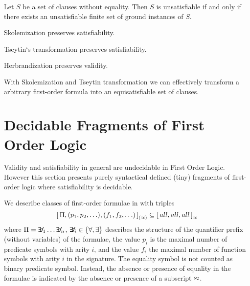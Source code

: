 \begin{corollary}
	Let \( S \) be a set of clauses without equality.
	Then \( S \) is unsatisfiable if and only if there exists
	an unsatisfiable finite set of ground instances of \( S \).
\end{corollary}

\begin{lemma}
	Skolemization preserves satisfiability.

	Tseytin`s transformation preserves satisfiability.
\end{lemma}

\begin{lemma}
	Herbrandization preserves validity.
\end{lemma}

\begin{lemma}
With Skolemization and Tseytin transformation we can effectively transform a arbitrary first-order formula into an equisatisfiable set of clauses.
\end{lemma}


\section{Decidable Fragments of First Order Logic}\label{sec:decidable:fol:fragments}

Validity and satisfiability in general are undecidable in First Order Logic.
However this section presents purely syntactical defined (tiny) fragments
of first-order logic where satisfiability is decidable.%





\begin{definition}[\cite{MR1482227}]\label{def:prefix:class}
	We describe classes of first-order formulae in \PNF{} with triples
	\[
	{[ \, \Pi, (p_1,p_2,\ldots), (f_1,f_2,\ldots) \, ]}_{(\approx)}
	\subseteq {[\, all, all, all\,]}_{\approx}
	\]
	where \( \Pi = \quantify_1 \ldots \quantify_n \),
	\( \quantify_i\in \{ \forall, \exists \} \)
	describes the structure of the quantifier prefix (without variables) of the formulae,
	the value \( p_i \) is the maximal number of predicate symbols with arity \( i \),
	and the value \( f_i \) the maximal number of function symbols with arity \( i \) in the signature.
	The equality symbol is not counted as binary predicate symbol. Instead,
	the absence or presence of equality in the formulae
	is indicated by the absence or presence of a subscript \( \approx \).
\end{definition}

